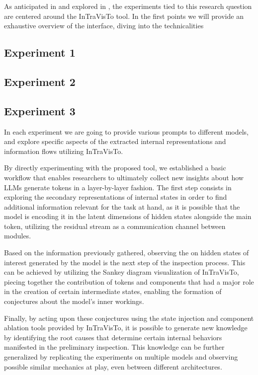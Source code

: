 As anticipated in  and explored in , the experiments tied to this research question are centered around the InTraVisTo tool.
In the first points we will provide an exhaustive overview of the interface, diving into the technicalities 


\subsection{Experiment 1}


\subsection{Experiment 2}


\subsection{Experiment 3}

In each experiment we are going to provide various prompts to different models, and explore specific aspects of the extracted internal representations and information flows utilizing InTraVisTo.

By directly experimenting with the proposed tool, we established a basic workflow that enables researchers to ultimately collect new insights about how LLMs generate tokens in a layer-by-layer fashion.  
The first step consists in exploring the secondary representations of internal states in order to find additional information relevant for the task at hand, as it is possible that the model is encoding it in the latent dimensions of hidden states alongside the main token, utilizing the residual stream as a communication channel between modules.

Based on the information previously gathered, observing the  on hidden states of interest generated by the model is the next step of the inspection process.
This can be achieved by utilizing the Sankey diagram visualization of InTraVisTo, piecing together the contribution of tokens and components that had a major role in the creation of certain intermediate states, enabling the formation of conjectures about the model's inner workings.

Finally, by acting upon these conjectures using the state injection and component ablation tools provided by InTraVisTo, it is possible to generate new knowledge by identifying the root causes that determine certain internal behaviors manifested in the preliminary inspection.
This knowledge can be further generalized by replicating the experiments on multiple models and observing possible similar mechanics at play, even between different architectures.

